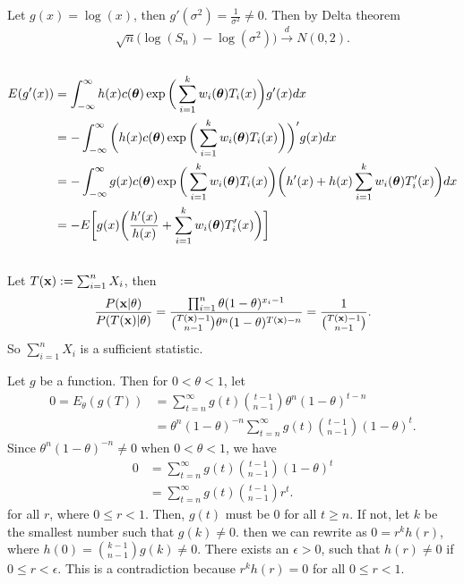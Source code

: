Let $g(x)=\log(x)$,
then $g'(\sigma^2)=\frac{1}{\sigma^2}\ne 0$.
Then by Delta theorem
\begin{equation}
    \sqrt{n}\big(\log(S_n)-\log(\sigma^2)\big) \xrightarrow{d} N(0,2).
\end{equation}

\subsection{} %

\begin{align}
    E(g'(x))
        &=\int_{-\infty}^{\infty} h(x)c(\boldsymbol{\theta})\exp\bigg(\sum_{i=1}^{k}w_i(\boldsymbol{\theta})T_i(x)\bigg)g'(x)dx \\
        &=-\int_{-\infty}^{\infty} \bigg(h(x)c(\boldsymbol{\theta})\exp\bigg(\sum_{i=1}^{k}w_i(\boldsymbol{\theta})T_i(x)\bigg)\bigg)'g(x)dx \\
        &=-\int_{-\infty}^{\infty} g(x)c(\boldsymbol{\theta})\exp\bigg(\sum_{i=1}^{k}w_i(\boldsymbol{\theta})T_i(x)\bigg)\bigg(h'(x)+h(x)\sum_{i=1}^k w_i(\boldsymbol{\theta})T_i'(x)\bigg)dx \\
        &=-E\bigg[g(x)\bigg(\frac{h'(x)}{h(x)}+\sum_{i=1}^k w_i(\boldsymbol{\theta})T_i'(x)\bigg)\bigg]
\end{align}

\subsection{} %

Let $T(\mathbf{x}):=\sum_{i=1}^n X_i$, then
\begin{equation}
    \frac{P(\mathbf{x}|\theta)}{P(T(\mathbf{x})|\theta)}
        = \frac{\prod_{i=1}^n \theta(1-\theta)^{x_i-1}}{\binom{T(\mathbf{x})-1}{n-1}\theta^n(1-\theta)^{T(\mathbf{x})-n}}
        = \frac{1}{\binom{T(\mathbf{x})-1}{n-1}}.
\end{equation}
So $\sum_{i=1}^n X_i$ is a sufficient statistic.

Let $g$ be a function. Then for $0<\theta<1$, let
\begin{align}
    0 = E_\theta(g(T))
        &= \sum_{t=n}^{\infty} g(t) \binom{t-1}{n-1}\theta^n(1-\theta)^{t-n} \\
        &= \theta^n(1-\theta)^{-n}\sum_{t=n}^{\infty} g(t) \binom{t-1}{n-1}(1-\theta)^{t}.
\end{align}
Since $\theta^n(1-\theta)^{-n}\ne0$ when $0<\theta<1$, we have
\begin{align}
    0
        &= \sum_{t=n}^{\infty} g(t) \binom{t-1}{n-1}(1-\theta)^{t} \\
        &= \sum_{t=n}^{\infty} g(t) \binom{t-1}{n-1}r^{t}.
\end{align}
for all $r$, where $0\le r<1$.
Then, $g(t)$ must be $0$ for all $t\ge n$.
If not, let $k$ be the smallest number such that $g(k)\ne 0$.
then we can rewrite as $0=r^k h(r)$, where $h(0)=\binom{k-1}{n-1}g(k)\ne 0$.
There exists an $\epsilon>0$, such that $h(r)\ne 0$ if $0\le r<\epsilon$.
This is a contradiction because $r^k h(r)=0$ for all $0\le r<1$.

